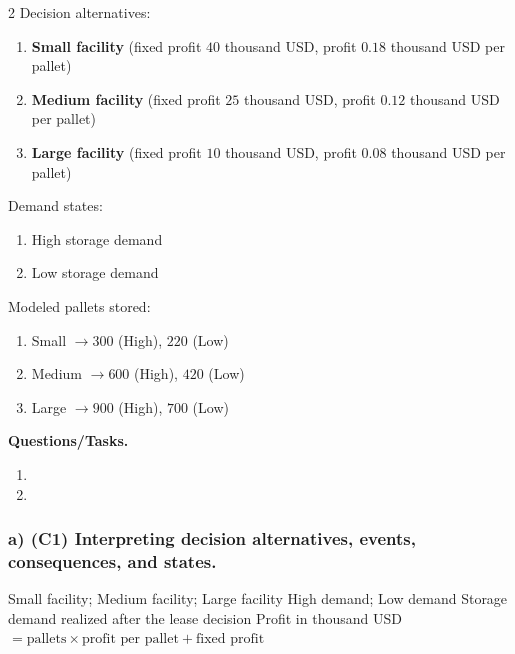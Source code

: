 	\begin{multicols}{2}
		Decision alternatives:
		\begin{enumerate}[label=\arabic*.]
			\item \textbf{Small facility} (fixed profit $40$ thousand USD, profit $0.18$ thousand USD per pallet)
			\item \textbf{Medium facility} (fixed profit $25$ thousand USD, profit $0.12$ thousand USD per pallet)
			\item \textbf{Large facility} (fixed profit $10$ thousand USD, profit $0.08$ thousand USD per pallet)
		\end{enumerate}
	
		Demand states:
		\begin{enumerate}[label=\arabic*.]
			\item High storage demand
			\item Low storage demand
		\end{enumerate}
	
			\columnbreak
	
		Modeled pallets stored:
		\begin{enumerate}[label=\arabic*.]
			\item Small $\to 300$ (High), $220$ (Low)
			\item Medium $\to 600$ (High), $420$ (Low)
			\item Large $\to 900$ (High), $700$ (Low)
		\end{enumerate}
	\end{multicols}

	\textbf{Questions/Tasks.}
	\begin{enumerate}[label=\textbf{\alph*)}]
		\item {}
		\item {}
	\end{enumerate}
	
	\subsubsection*{a) \textbf{(C1)} Interpreting decision alternatives, events, consequences, and states.}
	\label{subsec:problem11-cold-storage-contracts-c1}
	\DecisionElementsTable
	{Small facility; Medium facility; Large facility}
	{High demand; Low demand}
	{Storage demand realized after the lease decision}
	{Profit in thousand USD $= \text{pallets} \times \text{profit per pallet} + \text{fixed profit}$}
	

